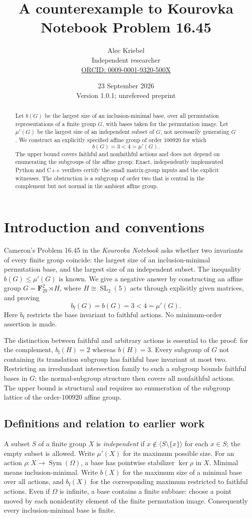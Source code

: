 \documentclass[11pt]{article}
\title{A counterexample to Kourovka Notebook Problem 16.45}
\author{Alec Kriebel\\\small Independent researcher\\\small\href{https://orcid.org/0009-0001-9320-500X}{ORCID: 0009-0001-9320-500X}}
\date{23 September 2026\\\small Version 1.0.1; unrefereed preprint}
\theoremstyle{remark}\newtheorem{remark}[theorem]{Remark}
\newcommand{\F}{\mathbf F}
\newcommand{\mup}{\mu'}
\newcommand{\bfth}{b_{\mathrm f}}
\newcommand{\SL}{\operatorname{SL}}
\newcommand{\Sym}{\operatorname{Sym}}
\begin{document}
\maketitle
\begin{abstract}
Let $b(G)$ be the largest size of an inclusion-minimal base, over all
permutation representations of a finite group $G$, with bases taken for the
permutation image. Let $\mup(G)$ be the largest size of an independent subset
of $G$, not necessarily generating $G$. We construct an explicitly specified
affine group of order $100920$ for which
\[
                 b(G)=3<4=\mup(G).
\]
The upper bound covers faithful and nonfaithful actions and does not depend on
enumerating the subgroups of the affine group. Exact, independently implemented
Python and C++ verifiers certify the small matrix-group inputs and the explicit
witnesses. The obstruction is a subgroup of order two that is central in the complement
but not normal in the ambient affine group.
\end{abstract}

\section{Introduction and conventions}
Cameron's Problem 16.45 in the \emph{Kourovka Notebook} asks whether two
invariants of every finite group coincide: the largest size of an
inclusion-minimal permutation base, and the largest size of an independent
subset. The inequality $b(G)\le\mup(G)$ is known. We give a negative answer
by constructing an affine group $G=\F_{29}^2\rtimes H$, where
$H\cong\SL_2(5)$ acts through explicitly given matrices, and proving
\[
                 \bfth(G)=b(G)=3<4=\mup(G).
\]
Here $\bfth$ restricts the base invariant to faithful actions. No
minimum-order assertion is made.

The distinction between faithful and arbitrary actions is essential to the
proof: for the complement, $\bfth(H)=2$ whereas $b(H)=3$. Every subgroup of
$G$ not containing its translation subgroup has faithful base invariant at
most two. Restricting an irredundant intersection family to such a subgroup
bounds faithful bases in $G$; the normal-subgroup structure then covers all
nonfaithful actions. The upper bound is structural and requires no enumeration
of the subgroup lattice of the order-$100920$ affine group.

\subsection{Definitions and relation to earlier work}
A subset $S$ of a finite group $X$ is \emph{independent} if
$x\notin\langle S\setminus\{x\}\rangle$ for each $x\in S$; the empty subset is
allowed. Write $\mup(X)$ for its maximum possible size. For an action
$\rho:X\to\Sym(\Omega)$, a base has pointwise stabilizer $\ker\rho$ in $X$.
Minimal means inclusion-minimal. Write $b(X)$ for the maximum size of a minimal
base over all actions, and $\bfth(X)$ for the corresponding maximum restricted
to faithful actions. Even if $\Omega$ is infinite, a base contains a finite
subbase: choose a point moved by each nonidentity element of the finite
permutation image. Consequently every inclusion-minimal base is finite.
\end{document}
